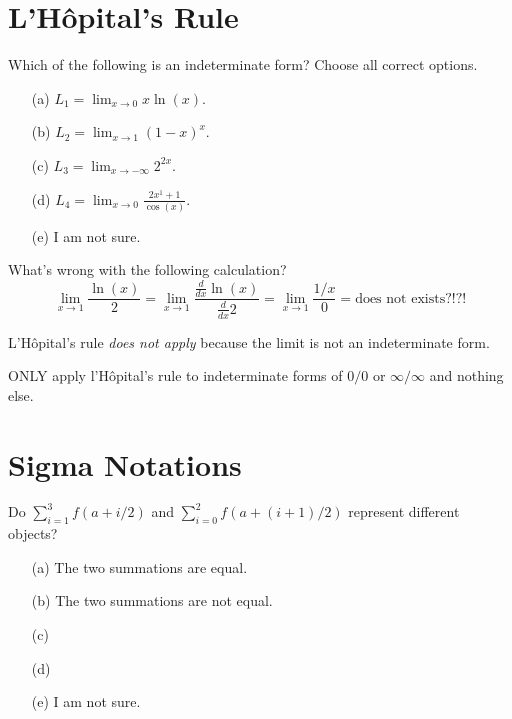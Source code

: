 \documentclass[14pt]{beamer}
\begin{document}
\section{L'H\^opital's Rule}
\begin{frame}[t]
  Which of the following is an indeterminate form? Choose all correct options.

  \medskip
  \begin{itemize} \setlength\itemsep{1ex}
    \item[(a)] \(L_{1} = \lim_{x \to 0} x \ln(x)\).
    \item[(b)] \(L_{2} = \lim_{x \to 1} (1 - x)^{x}\).
    \item[(c)] \(L_{3} = \lim_{x \to -\infty} 2^{2x}\).
    \item[(d)] \(L_{4} = \lim_{x \to 0} \frac{2x^{1}+1}{\cos(x)}\).
    \item[(e)] I am not sure.
  \end{itemize} 
\end{frame}

\begin{frame}
  What's wrong with the following calculation?
  \[
    \lim_{x \to 1} \frac{\ln(x)}{2} = \lim_{x \to 1} \frac{\frac{d}{dx} \ln(x)}{\frac{d}{dx} 2} = \lim_{x \to 1} \frac{1/x}{0} = \text{does not exists?!?!}
  \]

  \pause{} 

  L'H\^opital's rule \emph{does not apply} because the limit is not an indeterminate form.

  ONLY apply l'H\^opital's rule to indeterminate forms of \(0/0\) or \(\infty/\infty\) and nothing else.
\end{frame}

\section{Sigma Notations}

\begin{frame}[t]
Do \(\sum_{i=1}^{3} f(a + i/2)\) and \(\sum_{i=0}^{2} f(a + (i+1)/2)\) represent different objects?

  \medskip
  \begin{itemize} \setlength\itemsep{1ex}
    \item[(a)] The two summations are equal.
    \item[(b)] The two summations are not equal.
    \item[(c)] 
    \item[(d)] 
    \item[(e)] I am not sure.
  \end{itemize} 
\end{frame}
\end{document}

